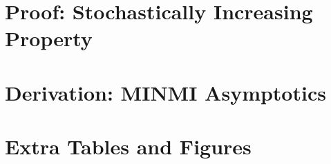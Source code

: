 \documentclass[honours,12pt]{UNSWthesis}
\begin{document}
\appendix



\chapter{Proof: Stochastically Increasing Property}\label{apx:minmi-stoch-incr-proof}


\chapter{Derivation: MINMI Asymptotics}\label{apx:minmi-asymptotics-proof}


\chapter{Extra Tables and Figures}\label{apx:extras}




\end{document}
